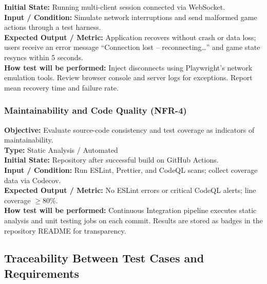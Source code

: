 \documentclass[12pt, titlepage]{article}
\begin{document}
    \textbf{Initial State:} Running multi-client session connected via WebSocket. \\

    \textbf{Input / Condition:} Simulate network interruptions and send malformed game actions through a test harness. \\

    \textbf{Expected Output / Metric:} Application recovers without crash or data loss; users receive an error message ``Connection lost – reconnecting…'' and game state resyncs within 5 seconds. \\

    \textbf{How test will be performed:}
    Inject disconnects using Playwright’s network emulation tools. Review browser console and server logs for exceptions. Report mean recovery time and failure rate.

    \subsubsection{Maintainability and Code Quality (NFR-4)}
    \textbf{Objective:} Evaluate source-code consistency and test coverage as indicators of maintainability. \\

    \textbf{Type:} Static Analysis / Automated \\

    \textbf{Initial State:} Repository after successful build on GitHub Actions. \\

    \textbf{Input / Condition:} Run ESLint, Prettier, and CodeQL scans; collect coverage data via Codecov. \\

    \textbf{Expected Output / Metric:} No ESLint errors or critical CodeQL alerts; line coverage $\geq 80$\%. \\

    \textbf{How test will be performed:}
    Continuous Integration pipeline executes static analysis and unit testing jobs on each commit. Results are stored as badges in the repository README for transparency.



\subsection{Traceability Between Test Cases and Requirements}
\end{document}
